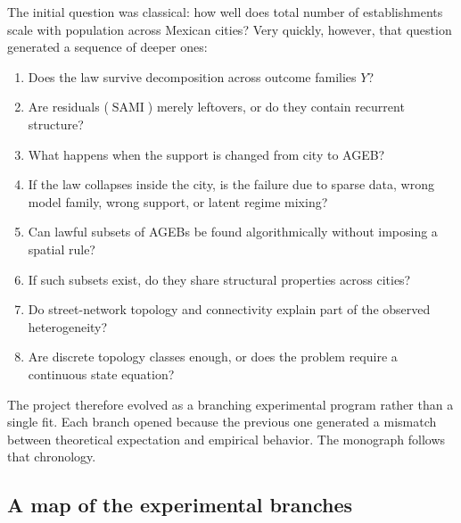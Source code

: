 \documentclass[11pt]{article}
\newcommand{\SAMI}{\operatorname{SAMI}}
\begin{document}
The initial question was classical: how well does total number of establishments scale with population across Mexican cities? Very quickly, however, that question generated a sequence of deeper ones:
\begin{enumerate}[label=\textbf{Q\arabic*.},leftmargin=2.4em]
\item Does the law survive decomposition across outcome families \(Y\)?
\item Are residuals (\(\SAMI\)) merely leftovers, or do they contain recurrent structure?
\item What happens when the support is changed from city to AGEB?
\item If the law collapses inside the city, is the failure due to sparse data, wrong model family, wrong support, or latent regime mixing?
\item Can lawful subsets of AGEBs be found algorithmically without imposing a spatial rule?
\item If such subsets exist, do they share structural properties across cities?
\item Do street-network topology and connectivity explain part of the observed heterogeneity?
\item Are discrete topology classes enough, or does the problem require a continuous state equation?
\end{enumerate}

The project therefore evolved as a branching experimental program rather than a single fit. Each branch opened because the previous one generated a mismatch between theoretical expectation and empirical behavior. The monograph follows that chronology.

\subsection{A map of the experimental branches}
\end{document}
